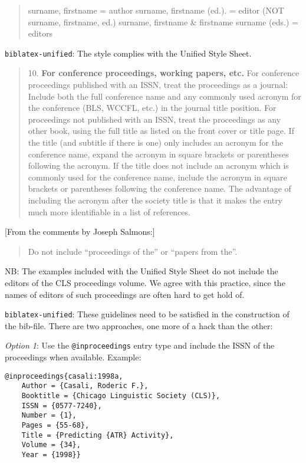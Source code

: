 \documentclass[
]{article}
\begin{document}
\begin{quote}
surname, firstname = author surname, firstname (ed.). = editor (NOT
surname, firstname, ed.) surname, firstname \& firstname surname (eds.)
= editors
\end{quote}

\texttt{biblatex-unified}: The style complies with the Unified Style
Sheet.

\begin{quote}
10. \textbf{For conference proceedings, working papers, etc.} For
conference proceedings published with an ISSN, treat the proceedings as
a journal: Include both the full conference name and any commonly used
acronym for the conference (BLS, WCCFL, etc.) in the journal title
position. For proceedings not published with an ISSN, treat the
proceedings as any other book, using the full title as listed on the
front cover or title page. If the title (and subtitle if there is one)
only includes an acronym for the conference name, expand the acronym in
square brackets or parentheses following the acronym. If the title does
not include an acronym which is commonly used for the conference name,
include the acronym in square brackets or parentheses following the
conference name. The advantage of including the acronym after the
society title is that it makes the entry much more identifiable in a
list of references.
\end{quote}

{[}From the comments by Joseph Salmons:{]}

\begin{quote}
Do not include ``proceedings of the'' or ``papers from the''.
\end{quote}

NB: The examples included with the Unified Style Sheet do not include
the editors of the CLS proceedings volume. We agree with this practice,
since the names of editors of such proceedings are often hard to get
hold of.

\texttt{biblatex-unified}: These guidelines need to be satisfied in the
construction of the bib-file. There are two approaches, one more of a
hack than the other:

\emph{Option 1}: Use the \texttt{@inproceedings} entry type and include
the ISSN of the proceedings when available. Example:

\begin{verbatim}
@inproceedings{casali:1998a,
    Author = {Casali, Roderic F.},
    Booktitle = {Chicago Linguistic Society (CLS)},
    ISSN = {0577-7240},
    Number = {1},
    Pages = {55-68},
    Title = {Predicting {ATR} Activity},
    Volume = {34},
    Year = {1998}}
\end{verbatim}
\end{document}
